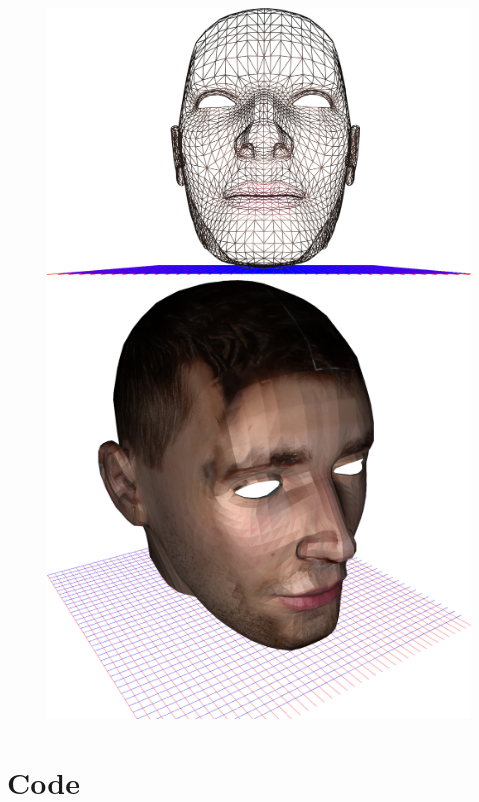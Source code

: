 \documentclass{article}
\newcommand{\mylisting}[3]{
    
}
\begin{document}
\begin{figure}[H]
\begin{minipage}{.5\textwidth}
        \centering
        \includegraphics[width=\linewidth]{pic_3.png}
    \end{minipage}%
    \begin{minipage}{.5\textwidth}
        \centering
        \includegraphics[width=\linewidth]{pic_4.png}
    \end{minipage}
\end{figure}
\vfill

\newpage
\section*{Code}
\mylisting{../code/main.cpp}{}{main}
\mylisting{../code/head.cpp}{}{head}
\mylisting{../code/head.h}{}{head}
\mylisting{../code/grid.cpp}{}{grid}
\mylisting{../code/grid.h}{}{grid}
\mylisting{../code/camera.cpp}{}{camera}
\mylisting{../code/camera.h}{}{camera}
\mylisting{../code/objloader.cpp}{}{objloader}
\mylisting{../code/objloader.h}{}{objloader}
\mylisting{../code/shader.cpp}{}{shader}
\mylisting{../code/shader.h}{}{shader}
\mylisting{../code/head_vert.glsl}{}{head vertex shader}
\mylisting{../code/head_frag.glsl}{}{head fragment shader}
\mylisting{../code/grid_vert.glsl}{}{grid vertex shader}
\mylisting{../code/grid_frag.glsl}{}{grid fragment shader}
\end{document}
